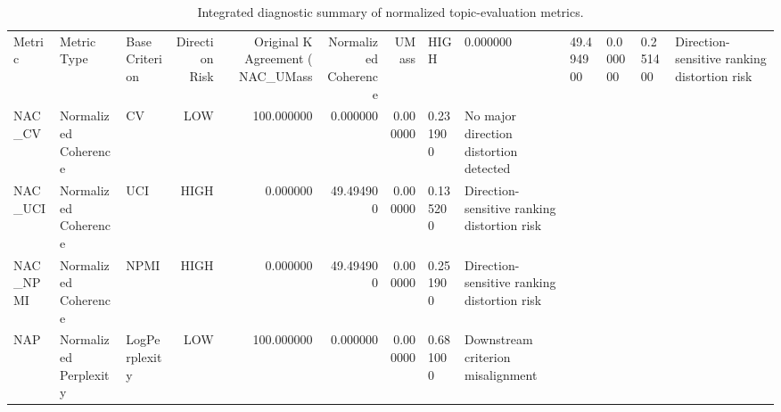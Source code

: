 \begin{table}
\caption{Integrated diagnostic summary of normalized topic-evaluation metrics.}
\label{tab:integrated_metric_failure}
\begin{tabular}{lllrrrrl}
\toprule
Metric & Metric Type & Base Criterion & Direction Risk & Original K Agreement (%
\midrule
NAC_UMass & Normalized Coherence & UMass & HIGH & 0.000000 & 49.494900 & 0.000000 & 0.251400 & Direction-sensitive ranking distortion risk \\
NAC_CV & Normalized Coherence & CV & LOW & 100.000000 & 0.000000 & 0.000000 & 0.231900 & No major direction distortion detected \\
NAC_UCI & Normalized Coherence & UCI & HIGH & 0.000000 & 49.494900 & 0.000000 & 0.135200 & Direction-sensitive ranking distortion risk \\
NAC_NPMI & Normalized Coherence & NPMI & HIGH & 0.000000 & 49.494900 & 0.000000 & 0.251900 & Direction-sensitive ranking distortion risk \\
NAP & Normalized Perplexity & LogPerplexity & LOW & 100.000000 & 0.000000 & 0.000000 & 0.681000 & Downstream criterion misalignment \\
\bottomrule
\end{tabular}
\end{table}
